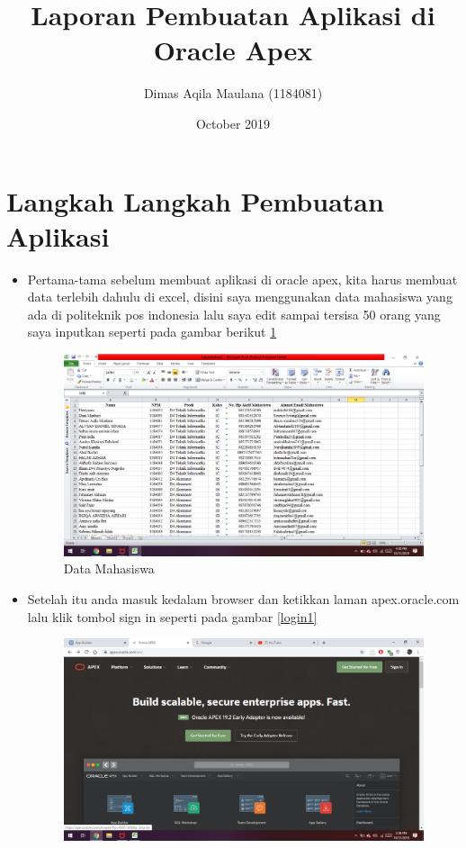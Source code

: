 \documentclass[12pt, times new roman, a4paper]{article}
\title{Laporan Pembuatan Aplikasi di Oracle Apex}
\author{Dimas Aqila Maulana (1184081)}
\date{October 2019}
\begin{document}
\maketitle
\section{Langkah Langkah Pembuatan Aplikasi}
\begin{itemize}
    \item Pertama-tama sebelum membuat aplikasi di oracle apex, kita harus membuat data terlebih dahulu di excel, disini saya menggunakan data mahasiswa yang ada di politeknik pos indonesia lalu saya edit sampai tersisa 50 orang yang saya inputkan seperti pada gambar berikut \ref{excel}
     \begin{figure}[!htbp]
        \centering
        \includegraphics[scale=0.27]{figures/excel.png}
        \caption{Data Mahasiswa}
        \label{excel}
    \end{figure}
    \item Setelah itu anda masuk kedalam browser dan ketikkan laman apex.oracle.com lalu klik tombol sign in seperti pada gambar \ref{login1}
    \begin{figure}[!htbp]
        \centering
        \includegraphics[scale=0.27]{figures/login1.png}

\end{figure}
\end{itemize}
\end{document}
